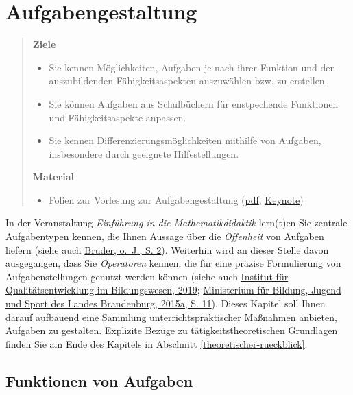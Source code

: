 \documentclass[
]{scrbook}
\providecommand{\tightlist}{%
  \setlength{\itemsep}{0pt}\setlength{\parskip}{0pt}}
\theoremstyle{definition}
\theoremstyle{definition}
\theoremstyle{definition}
\theoremstyle{definition}
\theoremstyle{remark}
\begin{document}
\hypertarget{aufgabengestaltung}{%
\chapter{Aufgabengestaltung}\label{aufgabengestaltung}}

\begin{quote}
\textbf{Ziele}

\begin{itemize}
\tightlist
\item
  Sie kennen Möglichkeiten, Aufgaben je nach ihrer Funktion und den auszubildenden Fähigkeitsaspekten auszuwählen bzw. zu erstellen.
\item
  Sie können Aufgaben aus Schulbüchern für enstpechende Funktionen und Fähigkeitsaspekte anpassen.
\item
  Sie kennen Differenzierungsmöglichkeiten mithilfe von Aufgaben, insbesondere durch geeignete Hilfestellungen.
\end{itemize}

\textbf{Material}

\begin{itemize}
\tightlist
\item
  Folien zur Vorlesung zur Aufgabengestaltung (\href{files/Stoffdidaktik-WiSe2223-Kap8.pdf}{pdf}, \href{files/Stoffdidaktik-WiSe2223-Kap8.key}{Keynote})
\end{itemize}
\end{quote}

In der Veranstaltung \emph{Einführung in die Mathematikdidaktik} lern(t)en Sie zentrale Aufgabentypen kennen, die Ihnen Aussage über die \emph{Offenheit} von Aufgaben liefern (siehe auch \protect\hyperlink{ref-Bruder}{Bruder, o.~J., S. 2}). Weiterhin wird an dieser Stelle davon ausgegangen, dass Sie \emph{Operatoren} kennen, die für eine präzise Formulierung von Aufgabenstellungen genutzt werden können (siehe auch \protect\hyperlink{ref-InstitutfurQualitatsentwicklungimBildungswesen2019}{Institut für Qualitätsentwicklung im Bildungswesen, 2019}; \protect\hyperlink{ref-MinisteriumfurBildungJugendundSportdesLandesBrandenburg}{Ministerium für Bildung, Jugend und Sport des Landes Brandenburg, 2015a, S. 11}). Dieses Kapitel soll Ihnen darauf aufbauend eine Sammlung unterrichtspraktischer Maßnahmen anbieten, Aufgaben zu gestalten. Explizite Bezüge zu tätigkeitstheoretischen Grundlagen finden Sie am Ende des Kapitels in Abschnitt \ref{theoretischer-rueckblick}.

\hypertarget{funktionen-von-aufgaben}{%
\section{Funktionen von Aufgaben}\label{funktionen-von-aufgaben}}
\end{document}
